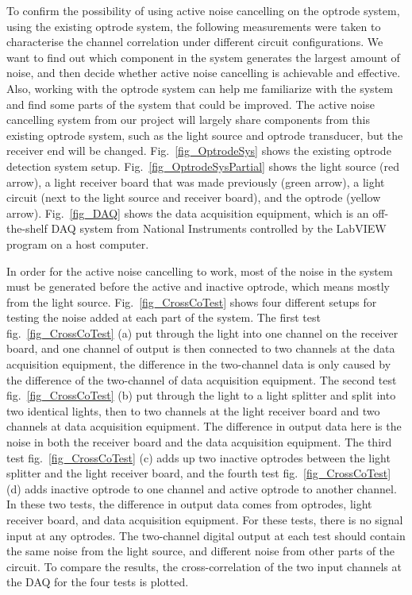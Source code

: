 To confirm the possibility of using active noise cancelling on the optrode system, using the existing optrode system, the following measurements were taken to characterise the channel correlation under different circuit configurations.  We want to find out which component in the system generates the largest amount of noise, and then decide whether active noise cancelling is achievable and effective.  Also, working with the optrode system can help me familiarize with the system and find some parts of the system that could be improved.  The active noise cancelling system from our project will largely share components from this existing optrode system, such as the light source and optrode transducer, but the receiver end will be changed.  Fig.~\ref{fig_OptrodeSys} shows the existing optrode detection system setup.  Fig.~\ref{fig_OptrodeSysPartial} shows the light source (red arrow), a light receiver board that was made previously (green arrow), a light circuit (next to the light source and receiver board), and the optrode (yellow arrow).  Fig.~\ref{fig_DAQ} shows the data acquisition equipment, which is an off-the-shelf DAQ system from National Instruments controlled by the LabVIEW program on a host computer.

In order for the active noise cancelling to work, most of the noise in the system must be generated before the active and inactive optrode, which means mostly from the light source.  Fig.~\ref{fig_CrossCoTest} shows four different setups for testing the noise added at each part of the system.  The first test fig.~\ref{fig_CrossCoTest} (a) put through the light into one channel on the receiver board, and one channel of output is then connected to two channels at the data acquisition equipment, the difference in the two-channel data is only caused by the difference of the two-channel of data acquisition equipment.  The second test fig.~\ref{fig_CrossCoTest} (b) put through the light to a light splitter and split into two identical lights, then to two channels at the light receiver board and two channels at data acquisition equipment.  The difference in output data here is the noise in both the receiver board and the data acquisition equipment.  The third test fig.~\ref{fig_CrossCoTest} (c) adds up two inactive optrodes between the light splitter and the light receiver board, and the fourth test fig.~\ref{fig_CrossCoTest} (d) adds inactive optrode to one channel and active optrode to another channel.  In these two tests, the difference in output data comes from optrodes, light receiver board, and data acquisition equipment.  For these tests, there is no signal input at any optrodes.  The two-channel digital output at each test should contain the same noise from the light source, and different noise from other parts of the circuit.  To compare the results, the cross-correlation of the two input channels at the DAQ for the four tests is plotted.

